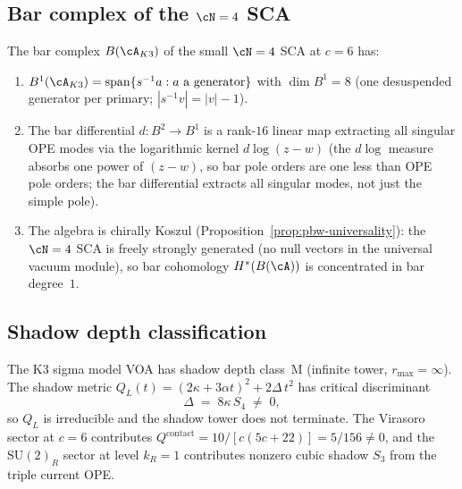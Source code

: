 \subsection{Bar complex of the $\cN = 4$ SCA}
\label{subsec:bar-n4}

\begin{proposition}
\label{prop:bar-n4-sca}
The bar complex $B(\cA_{K3})$ of the small $\cN = 4$ SCA at
$c = 6$ has:
\begin{enumerate}[label=\textup{(\roman*)}]
\item $B^1(\cA_{K3}) = \mathrm{span}\{s^{-1}a : a \text{ a
 generator}\}$ with $\dim B^1 = 8$
 \textup{(}one desuspended generator per primary;
 $|s^{-1}v| = |v| - 1$\textup{)}.
\item The bar differential $d\colon B^2 \to B^1$ is a
 rank-$16$ linear map extracting all singular OPE modes via
 the logarithmic kernel $d\log(z-w)$ \textup{(}the $d\log$
 measure absorbs one power of $(z-w)$, so bar pole orders are
 one less than OPE pole orders; the bar differential extracts
 all singular modes, not just the simple pole\textup{)}.
\item The algebra is chirally Koszul
 \textup{(}Proposition~\textup{\ref{prop:pbw-universality}}):
 the $\cN = 4$ SCA is freely strongly generated \textup{(}no null
 vectors in the universal vacuum module\textup{)}, so bar
 cohomology $H^*(B(\cA))$ is concentrated in bar degree~$1$.
\end{enumerate}
\end{proposition}

\subsection{Shadow depth classification}
\label{subsec:shadow-depth-k3}

\begin{proposition}
\label{prop:shadow-class-k3}
The K3 sigma model VOA has shadow depth class~M
\textup{(}infinite tower, $r_{\max} = \infty$\textup{)}.
The shadow metric
$Q_L(t) = (2\kappa + 3\alpha t)^2 + 2\Delta\,t^2$ has
critical discriminant
\[
\Delta \;=\; 8\kappa\,S_4 \;\neq\; 0,
\]
so $Q_L$ is irreducible and the shadow tower does not terminate.
The Virasoro sector at $c = 6$ contributes
$Q^{\mathrm{contact}} = 10/[c(5c+22)] = 5/156 \neq 0$, and the
$\mathrm{SU}(2)_R$ sector at level $k_R = 1$ contributes nonzero
cubic shadow $S_3$ from the triple current OPE.
\end{proposition}

